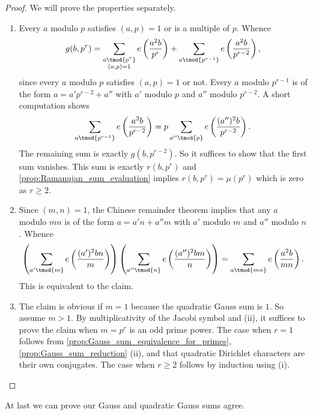 \documentclass[12pt]{article}
\begin{document}
      \begin{proof}
        We will prove the properties separately.
        \begin{enumerate}[label*=(\roman*)]
          \item Every \(a\) modulo \(p\) satisfies \((a,p) = 1\) or is a multiple of \(p\). Whence
          \[
            g(b,p^{r}) = \sum_{\substack{a \tmod{p^{r}} \\ (a,p) = 1}}e\left(\frac{a^{2}b}{p^{r}}\right)+\sum_{a \tmod{p^{r-1}}}e\left(\frac{a^{2}b}{p^{r-2}}\right),
          \]
          since every \(a\) modulo \(p\) satisfies \((a,p) = 1\) or not. Every \(a\) modulo \(p^{r-1}\) is of the form \(a = a'p^{r-2}+a''\) with \(a'\) modulo \(p\) and \(a''\) modulo \(p^{r-2}\). A short computation shows
          \[
            \sum_{a \tmod{p^{r-1}}}e\left(\frac{a^{2}b}{p^{r-2}}\right) = p\sum_{a'' \tmod{p}}e\left(\frac{(a'')^{2}b}{p^{r-2}}\right).
          \]
          The remaining sum is exactly \(g(b,p^{r-2})\). So it suffices to show that the first sum vanishes. This sum is exactly \(r(b,p^{r})\) and \cref{prop:Ramanujan_sum_evaluation} implies \(r(b,p^{r}) = \mu(p^{r})\) which is zero as \(r \ge 2\).
          \item Since \((m,n) = 1\), the Chinese remainder theorem implies that any \(a\) modulo \(mn\) is of the form \(a = a'n+a''m\) with \(a'\) modulo \(m\) and \(a''\) modulo \(n\). Whence
          \[
            \left(\sum_{a' \tmod{m}}e\left(\frac{(a')^{2}bn}{m}\right)\right)\left(\sum_{a'' \tmod{n}}e\left(\frac{(a'')^{2}bm}{n}\right)\right) = \sum_{a \tmod{mn}}e\left(\frac{a^{2}b}{mn}\right).
          \]
          This is equivalent to the claim.
          \item The claim is obvious if \(m = 1\) because the quadratic Gauss sum is \(1\). So assume \(m > 1\). By multiplicativity of the Jacobi symbol and (ii), it suffices to prove the claim when \(m = p^{r}\) is an odd prime power. The case when \(r = 1\) follows from \cref{prop:Gauss_sum_equivalence_for_primes}, \cref{prop:Gauss_sum_reduction} (ii), and that quadratic Dirichlet characters are their own conjugates. The case when \(r \ge 2\) follows by induction using (i).
        \end{enumerate}
      \end{proof}

      At last we can prove our Gauss and quadratic Gauss sums agree.
\end{document}
